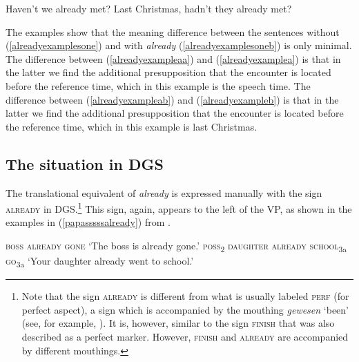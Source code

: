 \begin{exe}
\ex\label{alreadyexamplesoneb}\begin{xlist}  
\ex Haven't we already met? \label{alreadyexamplea}
\ex Last Christmas, hadn't they already met? \label{alreadyexampleb}
\end{xlist}
\end{exe} 

\noindent The examples show that the meaning difference between the sentences without (\ref{alreadyexamplesone}) and with \textit{already} (\ref{alreadyexamplesoneb}) is only minimal. The difference between (\ref{alreadyexampleaa}) and (\ref{alreadyexamplea}) is that in the latter we find the additional presupposition that the encounter is located before the reference time, which in this example is the speech time. The difference between (\ref{alreadyexampleab}) and (\ref{alreadyexampleb}) is that in the latter we find the additional presupposition that the encounter is located before the reference time, which in this example is last Christmas.

\subsection{The situation in DGS}
The translational equivalent of \textit{already} is expressed manually with the sign \textsc{already} in DGS.\footnote{ Note that the sign \textsc{already} is different from what is usually labeled \textsc{perf} (for perfect aspect), a sign which is accompanied by the mouthing \textit{gewesen} `been' (see, for example, \citealt[292]{happ2014vork}). It is, however, similar to the sign \textsc{finish} that was also described as a perfect marker. However, \textsc{finish} and \textsc{already} are accompanied by different mouthings.} This sign, again, appears to the left of the VP, as shown in the examples in (\ref{papasssssalready}) from \citet[155]{papaspyrou2008grammatik}.

\begin{exe}
\ex\label{papasssssalready}\begin{xlist} 
\ex \textsc{boss already gone} 
\glt `The boss is already gone.' \label{alreadygonepapaa}
\ex \textsc{poss}\textsubscript{2} \textsc{daughter already school}\textsubscript{3a} \textsc{go}\textsubscript{3a}
\glt `Your daughter already went to school.' \label{alreadygonepapaa}
\end{xlist}
\end{exe} 

